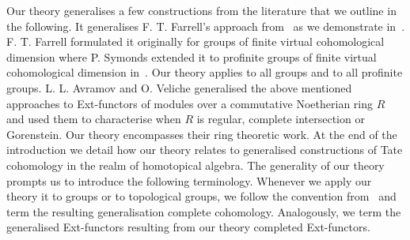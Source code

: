 \documentclass[12pt,a4paper]{article}
\numberwithin{equation}{section}
\theoremstyle{nonumberplain}
\begin{document}
Our theory generalises a few constructions from the literature that we outline in the following. It generalises F.\! T.\! Farrell's approach from~\cite{far77} as we demonstrate in~\cite[Lemma~1.11]{ghe24}. F.\! T.\! Farrell formulated it originally for groups of finite virtual cohomological dimension where P.\! Symonds extended it to profinite groups of finite virtual cohomological dimension in~\cite[p.~34]{sym07}. Our theory applies to all groups and to all profinite groups. L.\! L.\! Avramov and O.\! Veliche generalised the above mentioned approaches to Ext-functors of modules over a commutative Noetherian ring $R$ and used them to characterise when $R$ is regular, complete intersection or Gorenstein. Our theory encompasses their ring theoretic work. At the end of the introduction we detail how our theory relates to generalised constructions of Tate cohomology in the realm of homotopical algebra. The generality of our theory prompts us to introduce the following terminology. Whenever we apply our theory it to groups or to topological groups, we follow the convention from~\cite{kro95} and term the resulting generalisation complete cohomology. Analogously, we term the generalised Ext-functors resulting from our theory completed Ext-functors. \\
\end{document}

